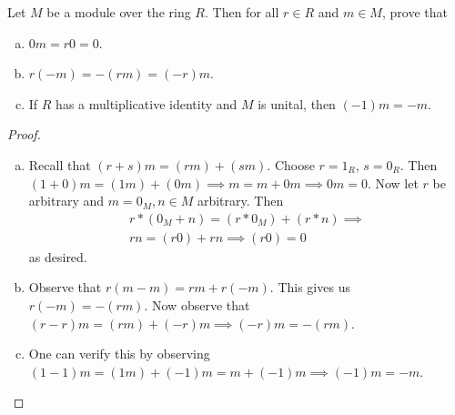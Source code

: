 \documentclass[num=2,duedate=02-10-21,course=Algebra\ II,proflastname=Walton]{hwtemplate}
\begin{document}
\problem[2]
\begin{claim}
	
Let \(M\) be a module over the ring \(R\). Then for all \(r \in R\) and \(m \in M\), prove that
\begin{enumerate}[(a).]
	\item \(0m = r 0 = 0\).
	\item \(r(-m) = -(rm) = (-r)m\).
	\item If \(R\) has a multiplicative identity and \(M\) is unital, then \((-1)m = -m\).
\end{enumerate}

\end{claim}
\begin{proof}
	\begin{enumerate}[(a).]
		\item Recall that \((r+s)m = (rm) + (sm)\). Choose \(r=1_R\), \(s = 0_R\). Then \((1+0)m = (1m) + (0m) \implies m = m + 0m \implies 0m = 0\). Now let \(r\) be arbitrary and \(m = 0_M, n \in M\) arbitrary. Then
			\begin{align*}
				r * (0_M + n) = (r * 0_M) + (r * n) \implies\\
				rn = (r 0) + rn \implies (r 0) = 0
			\end{align*}
			as desired.
		\item Observe that \(r(m-m) = rm + r(-m)\). This gives us \(r(-m) = -(rm)\). Now observe that \((r-r)m = (rm) + (-r)m \implies (-r)m = -(rm)\).
		\item One can verify this by observing \((1-1)m = (1m) + (-1)m = m + (-1)m \implies (-1)m = -m\).
\end{enumerate}
\end{proof}
\end{document}
